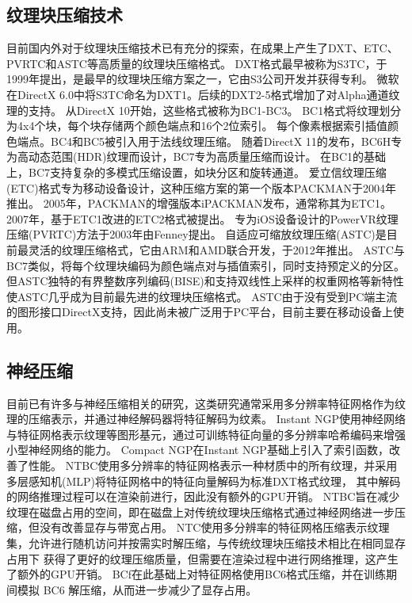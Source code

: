 \subsection{纹理块压缩技术}
目前国内外对于纹理块压缩技术已有充分的探索，在成果上产生了DXT、ETC、PVRTC和ASTC等高质量的纹理块压缩格式。
DXT格式最早被称为S3TC\cite{iourcha1999system}，于1999年提出，是最早的纹理块压缩方案之一，它由S3公司开发并获得专利。
微软在DirectX 6.0中将S3TC命名为DXT1。后续的DXT2-5格式增加了对Alpha通道纹理的支持。
从DirectX 10开始，这些格式被称为BC1-BC3。
BC1格式将纹理划分为4x4个块，每个块存储两个颜色端点和16个2位索引。
每个像素根据索引插值颜色端点。BC4和BC5被引入用于法线纹理压缩。
随着DirectX 11的发布，BC6H专为高动态范围(HDR)纹理而设计，BC7专为高质量压缩而设计。
在BC1的基础上，BC7支持复杂的多模式压缩设置，如块分区和旋转通道。
爱立信纹理压缩(ETC)格式专为移动设备设计，这种压缩方案的第一个版本PACKMAN\cite{strom2004packman}于2004年推出。
2005年，PACKMAN的增强版本iPACKMAN\cite{strom2005packman}发布，通常称其为ETC1。
2007年，基于ETC1改进的ETC2\cite{strom2007etc}格式被提出。
专为iOS设备设计的PowerVR纹理压缩(PVRTC)方法于2003年由Fenney\cite{fenney2003texture}提出。
自适应可缩放纹理压缩(ASTC)\cite{nystad2012adaptive}是目前最灵活的纹理压缩格式，它由ARM和AMD联合开发，于2012年推出。
ASTC与BC7类似，将每个纹理块编码为颜色端点对与插值索引，同时支持预定义的分区。
但ASTC独特的有界整数序列编码(BISE)和支持双线性上采样的权重网格等新特性使ASTC几乎成为目前最先进的纹理块压缩格式。
ASTC由于没有受到PC端主流的图形接口DirectX支持，因此尚未被广泛用于PC平台，目前主要在移动设备上使用\cite{vaidyanathan2023random}。

\subsection{神经压缩}

目前已有许多与神经压缩相关的研究，这类研究通常采用多分辨率特征网格作为纹理的压缩表示，并通过神经解码器将特征解码为纹素。
Instant NGP\cite{muller2022instant}使用神经网络与特征网格表示纹理等图形基元，通过可训练特征向量的多分辨率哈希编码来增强小型神经网络的能力。
Compact NGP\cite{takikawa2023compact}在Instant NGP基础上引入了索引函数，改善了性能。
NTBC\cite{fujieda2024neural}使用多分辨率的特征网格表示一种材质中的所有纹理，并采用多层感知机(MLP)将特征网格中的特征向量解码为标准DXT格式纹理，
其中解码的网络推理过程可以在渲染前进行，因此没有额外的GPU开销。
NTBC旨在减少纹理在磁盘占用的空间，即在磁盘上对传统纹理块压缩格式通过神经网络进一步压缩，但没有改善显存与带宽占用。
NTC\cite{vaidyanathan2023random}使用多分辨率的特征网格压缩表示纹理集，允许进行随机访问并按需实时解压缩，与传统纹理块压缩技术相比在相同显存占用下
获得了更好的纹理压缩质量，但需要在渲染过程中进行网络推理，这产生了额外的GPU开销。
BCf\cite{weinreich2024real}在此基础上对特征网格使用BC6格式压缩，并在训练期间模拟 BC6 解压缩，从而进一步减少了显存占用。

